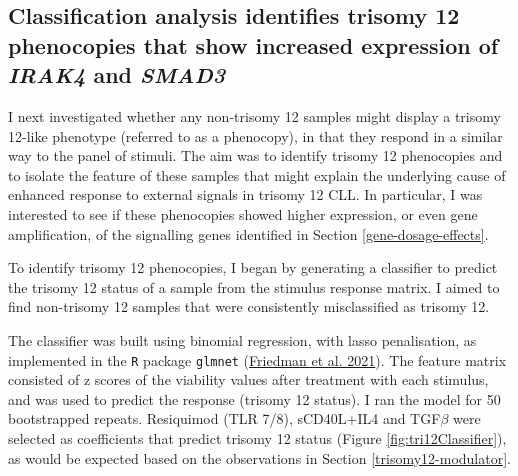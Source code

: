 \documentclass[11pt, a4paper, twosided]{book}
\begin{document}
\hypertarget{trisomy12-classifier}{%
\subsection{\texorpdfstring{Classification analysis identifies trisomy 12 phenocopies that show increased expression of \emph{IRAK4} and \emph{SMAD3}}{Classification analysis identifies trisomy 12 phenocopies that show increased expression of IRAK4 and SMAD3}}\label{trisomy12-classifier}}

I next investigated whether any non-trisomy 12 samples might display a trisomy 12-like phenotype (referred to as a phenocopy), in that they respond in a similar way to the panel of stimuli. The aim was to identify trisomy 12 phenocopies and to isolate the feature of these samples that might explain the underlying cause of enhanced response to external signals in trisomy 12 CLL. In particular, I was interested to see if these phenocopies showed higher expression, or even gene amplification, of the signalling genes identified in Section \ref{gene-dosage-effects}.

To identify trisomy 12 phenocopies, I began by generating a classifier to predict the trisomy 12 status of a sample from the stimulus response matrix. I aimed to find non-trisomy 12 samples that were consistently misclassified as trisomy 12.

The classifier was built using binomial regression, with lasso penalisation, as implemented in the \texttt{R} package \texttt{glmnet} (\protect\hyperlink{ref-R-glmnet}{Friedman et al. 2021}). The feature matrix consisted of z scores of the viability values after treatment with each stimulus, and was used to predict the response (trisomy 12 status). I ran the model for 50 bootstrapped repeats. Resiquimod (TLR 7/8), sCD40L+IL4 and TGF\(\beta\) were selected as coefficients that predict trisomy 12 status (Figure \ref{fig:tri12Classifier}), as would be expected based on the observations in Section \ref{trisomy12-modulator}.
\end{document}
